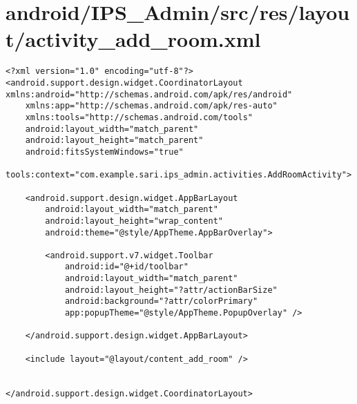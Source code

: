 \section{android/IPS\_Admin/src/res/layout/activity\_add\_room.xml}
\begin{lstlisting}<?xml version="1.0" encoding="utf-8"?>
<android.support.design.widget.CoordinatorLayout xmlns:android="http://schemas.android.com/apk/res/android"
    xmlns:app="http://schemas.android.com/apk/res-auto"
    xmlns:tools="http://schemas.android.com/tools"
    android:layout_width="match_parent"
    android:layout_height="match_parent"
    android:fitsSystemWindows="true"
    tools:context="com.example.sari.ips_admin.activities.AddRoomActivity">

    <android.support.design.widget.AppBarLayout
        android:layout_width="match_parent"
        android:layout_height="wrap_content"
        android:theme="@style/AppTheme.AppBarOverlay">

        <android.support.v7.widget.Toolbar
            android:id="@+id/toolbar"
            android:layout_width="match_parent"
            android:layout_height="?attr/actionBarSize"
            android:background="?attr/colorPrimary"
            app:popupTheme="@style/AppTheme.PopupOverlay" />

    </android.support.design.widget.AppBarLayout>

    <include layout="@layout/content_add_room" />


</android.support.design.widget.CoordinatorLayout>
\end{lstlisting}
\newpage
